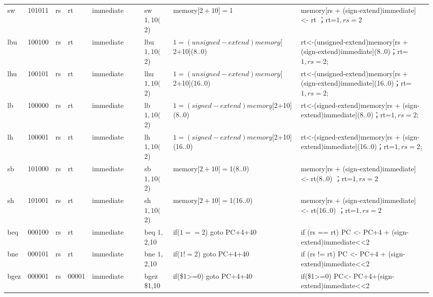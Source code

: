 \documentclass[12pt,a4paper]{article}
\begin{document}
\begin{landscape}
\begin{table}[]
{\begin{tabular}{llllllllll}
sw      & 101011 & rs      & rt    & immediate &       &        & sw $1,10($2)   & memory{[}$2+10]=$1                         & memory{[}rs +   (sign-extend)immediate{]} \textless{}- rt ；rt=$1,rs=$2                       \\
lbu     & 100100 & rs      & rt    & immediate &       &        & lbu $1,10($2)  & $1=(unsigned-extend)memory[$2+10{]}(8..0)  & rt\textless{}-(unsigned-extend)memory{[}rs +   (sign-extend)immediate{]}(8..0)；rt=$1,rs=$2;  \\
lhu     & 100101 & rs      & rt    & immediate &       &        & lhu $1,10($2)  & $1=(unsigned-extend)memory[$2+10{]}(16..0) & rt\textless{}-(unsigned-extend)memory{[}rs +   (sign-extend)immediate{]}(16..0)；rt=$1,rs=$2; \\
lb      & 100000 & rs      & rt    & immediate &       &        & lb $1,10($2)   & $1=(signed-extend)memory[$2+10{]}(8..0)    & rt\textless{}-(signed-extend)memory{[}rs +   (sign-extend)immediate{]}(8..0)；rt=$1,rs=$2;    \\
lh      & 100001 & rs      & rt    & immediate &       &        & lh $1,10($2)   & $1=(signed-extend)memory[$2+10{]}(16..0)   & rt\textless{}-(signed-extend)memory{[}rs +   (sign-extend)immediate{]}(16..0)；rt=$1,rs=$2;   \\
sb      & 101000 & rs      & rt    & immediate &       &        & sb $1,10($2)   & memory{[}$2+10]=$1(8..0)                   & memory{[}rs + (sign-extend)immediate{]} \textless{}-   rt(8..0) ；rt=$1,rs=$2                 \\
sh      & 101001 & rs      & rt    & immediate &       &        & sh $1,10($2)   & memory{[}$2+10]=$1(16..0)                  & memory{[}rs + (sign-extend)immediate{]} \textless{}-   rt(16..0) ；rt=$1,rs=$2                \\
beq     & 000100 & rs      & rt    & immediate &       &        & beq $1,$2,10   & if($1==$2)  goto PC+4+40                   & if (rs == rt) PC \textless{}- PC+4 +   (sign-extend)immediate\textless{}\textless{}2         \\
bne     & 000101 & rs      & rt    & immediate &       &        & bne $1,$2,10   & if($1!=$2) goto PC+4+40                    & if (rs != rt) PC \textless{}- PC+4 +   (sign-extend)immediate\textless{}\textless{}2         \\
bgez    & 000001 & rs      & 00001 & immediate &       &        & bgez \$1,10    & if(\$1\textgreater{}=0) goto PC+4+40       & if(\$1\textgreater{}=0) PC\textless{}- PC+4+(sign-extend)immediate\textless{}\textless{}2    \\

\end{tabular}}
\end{table}
\end{landscape}
\end{document}
